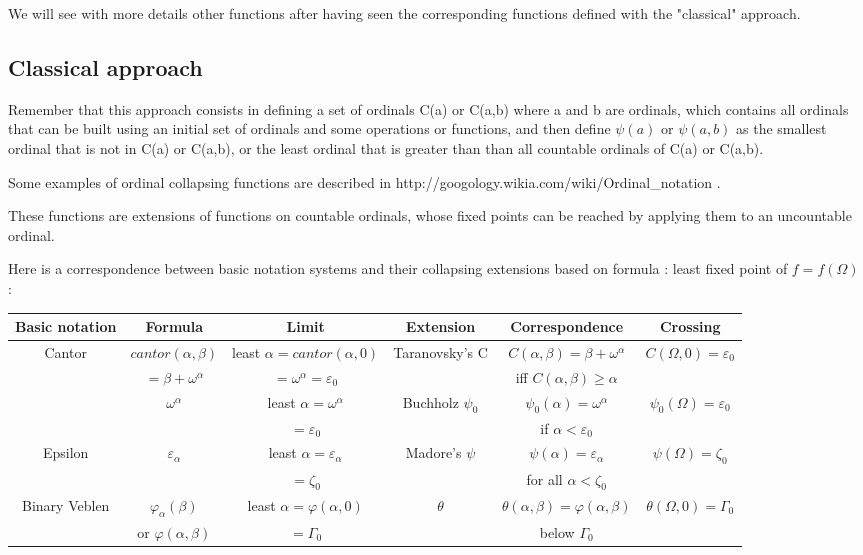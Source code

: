 \documentclass[10pt]{article}
\begin{document}
\bigskip

We will see with more details other functions after having seen the corresponding functions defined with the "classical" approach.

\subsection{Classical approach}

Remember that this approach consists in defining a set of ordinals C(a) or C(a,b) where a and b are ordinals, which contains all ordinals that can be built using an initial set of ordinals and some operations or functions, and then define \( \psi(a) \) or \( \psi(a,b) \) as the smallest ordinal that is not in C(a) or C(a,b), or the least ordinal that is greater than than all countable ordinals of C(a) or C(a,b).

Some examples of ordinal collapsing functions are described in http://googology.wikia.com/wiki/Ordinal\_notation .

These functions are extensions of functions on countable ordinals, whose fixed points can be reached by applying them to an uncountable ordinal.

Here is a correspondence between basic notation systems and their collapsing extensions based on formula : least fixed point of \( f = f(\Omega) \) :

\bigskip

\begin{tabular}{|c|c|c|c|c|c|} \hline
Basic notation	& Formula			& Limit					& Extension		& Correspondence					& Crossing 				\\ \hline
Cantor		& \( cantor(\alpha,\beta) \)	& least \( \alpha = cantor(\alpha,0) \)	& Taranovsky's C	& \( C(\alpha,\beta) = \beta+\omega^\alpha \)		& \( C(\Omega,0) = \varepsilon_0 \)	\\
		& \( = \beta + \omega^\alpha \)	& \( = \omega^\alpha = \varepsilon_0 \)	&			& iff \( C(\alpha,\beta) \geq \alpha \)			&					\\ \hline
		& \( \omega^\alpha \)		& least \( \alpha = \omega^\alpha \)	& Buchholz \( \psi_0 \) & \( \psi_0(\alpha) = \omega^\alpha \)			& \( \psi_0(\Omega) = \varepsilon_0 \)	\\
		&				& \( = \varepsilon_0 \)			&			& if \( \alpha < \varepsilon_0 \)			&					\\ \hline
Epsilon		& \( \varepsilon_\alpha	\)	& least \( \alpha = \varepsilon_\alpha\)& Madore's \( \psi \)	& \( \psi(\alpha) = \varepsilon_\alpha \)		& \( \psi(\Omega) = \zeta_0 \)		\\
		&				& \( = \zeta_0 \)			&			& for all \( \alpha < \zeta_0 \)			& 					\\ \hline
Binary Veblen	& \( \varphi_\alpha(\beta) \)	& least \( \alpha = \varphi(\alpha,0) \)& \( \theta \)		& \( \theta(\alpha,\beta) = \varphi(\alpha,\beta) \)	& \( \theta(\Omega,0) = \Gamma_0 \)	\\
		& or \( \varphi(\alpha,\beta) \)& \( = \Gamma_0 \)			&			& below \( \Gamma_0 \)					&					\\ \hline
													
\end{tabular}
\end{document}
